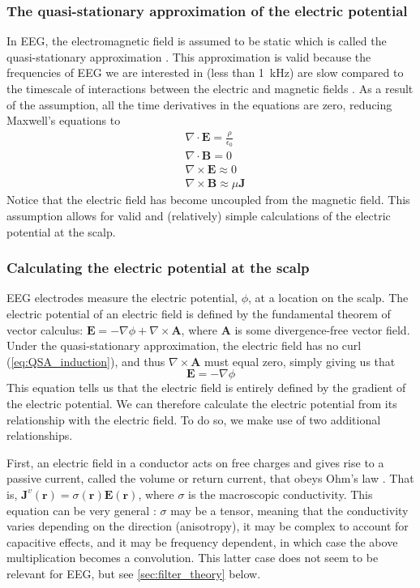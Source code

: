 \subsubsection{The quasi-stationary approximation of the electric potential}
In EEG, the electromagnetic field is assumed to be static which is called the quasi-stationary approximation \cite{Plonsey1967}. This approximation is valid because the frequencies of EEG we are interested in (less than \qty{1}{\kilo\hertz}) are slow compared to the timescale of interactions between the electric and magnetic fields \cite{RevModPhys.65.413}. As a result of the assumption, all the time derivatives in the equations are zero, reducing Maxwell's equations to
\begin{align}
    & \nabla \cdot \bm{E} = \frac{\rho}{\epsilon_0} \\
    & \nabla \cdot \bm{B} = 0 \\ 
    & \nabla \times \bm{E} \approx 0 \label{eq:QSA_induction} \\ 
    & \nabla \times \bm{B} \approx \mu \bm{J} \label{eq:QSA_amp_law}
\end{align}
Notice that the electric field has become uncoupled from the magnetic field. This assumption allows for valid and (relatively) simple calculations of the electric potential at the scalp.

\subsubsection{Calculating the electric potential at the scalp}
EEG electrodes measure the electric potential, $\phi$, at a location on the scalp. The electric potential of an electric field is defined by the fundamental theorem of vector calculus: $\bm{E} = - \nabla \phi + \nabla \times \bm{A}$, where $\bm{A}$ is some divergence-free vector field. Under the quasi-stationary approximation, the electric field has no curl (\ref{eq:QSA_induction}), and thus $\nabla \times \bm{A}$ must equal zero, simply giving us that 
\begin{equation} \label{eq:potential}
\bm{E} = -\nabla \phi
\end{equation}
This equation tells us that the electric field is entirely defined by the gradient of the electric potential. We can therefore calculate the electric potential from its relationship with the electric field. To do so, we make use of two additional relationships.

First, an electric field in a conductor acts on free charges and gives rise to a passive current, called the volume or return current, that obeys Ohm's law  \cite{RevModPhys.65.413}. That is, $\bm{J}^{v}(\bm{r}) = \sigma(\bm{r}) \bm{E}(\bm{r})$, where $\sigma$ is the macroscopic conductivity. This equation can be very general \cite{Pettersen2012}: $\sigma$ may be a tensor, meaning that the conductivity varies depending on the direction (anisotropy), it may be complex to account for capacitive effects, and it may be frequency dependent, in which case the above multiplication becomes a convolution. This latter case does not seem to be relevant for EEG, but see \autoref{sec:filter_theory} below.


